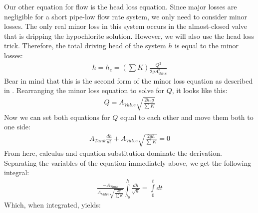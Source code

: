 \documentclass[letterpaper,10pt,english]{sphinxmanual}
\begin{document}
Our other equation for flow is the head loss equation. Since major losses are negligible for a short pipe-low flow rate system, we only need to consider minor losses. The only real minor loss in this system occurs in the almost-closed valve that is dripping the hypochlorite solution. However, we will also use the head loss trick. Therefore, the total driving head of the system \(h\) is equal to the minor losses:
\begin{equation}\label{equation:Flow_Control_and_Measurement/FCM_Derivations:Flow_Control_and_Measurement/FCM_Derivations:1}
\begin{split}h = h_e = \left( \sum K \right) \frac{Q^2}{2gA_{Valve}^2}\end{split}
\end{equation}
Bear in mind that this is the second form of the minor loss equation as described in {\hyperref[\detokenize{Fluids_Review/Fluids_Review_Derivations:final-minor-loss-equations}]{}}. Rearranging the minor loss equation to solve for \(Q\), it looks like this:
\begin{equation}\label{equation:Flow_Control_and_Measurement/FCM_Derivations:Flow_Control_and_Measurement/FCM_Derivations:2}
\begin{split}Q = A_{Valve} \sqrt{\frac{2 h_e g}{\sum K}}\end{split}
\end{equation}
Now we can set both equations for \(Q\) equal to each other and move them both to one side:
\begin{equation}\label{equation:Flow_Control_and_Measurement/FCM_Derivations:Flow_Control_and_Measurement/FCM_Derivations:3}
\begin{split}A_{Tank} \frac{dh}{dt} + A_{Valve} \sqrt{\frac{2gh}{\sum K}} = 0\end{split}
\end{equation}
From here, calculus and equation substitution dominate the derivation. Separating the variables of the equation immediately above, we get the following integral:
\begin{equation}\label{equation:Flow_Control_and_Measurement/FCM_Derivations:Flow_Control_and_Measurement/FCM_Derivations:4}
\begin{split}\frac{ -A_{Tank}}{{A_{Valve}} \sqrt{\frac{2g}{\sum K}} }   \int \limits_{h_0}^h \frac{dh}{\sqrt h} = \int \limits_0^t {dt}\end{split}
\end{equation}
Which, when integrated, yields:
\end{document}
